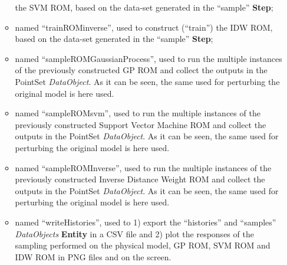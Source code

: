 \begin{enumerate}
\begin{itemize}
     the SVM ROM, based on the data-set generated in the  ``sample'' \textbf{Step};
     \item {} named ``trainROMinverse'', used to construct (``train'')
     the IDW ROM, based on the data-set generated in the  ``sample'' \textbf{Step};
     \item {} named ``sampleROMGaussianProcess'', used to run the multiple
     instances of the previously constructed GP ROM and
     collect the outputs in the PointSet \textit{DataObject}. As it can be
     seen, the same  used for perturbing the original model is here used.
     \item {} named ``sampleROMsvm'', used to run the multiple
     instances of the previously constructed Support Vector Machine ROM and
     collect the outputs in the PointSet \textit{DataObject}. As it can be
     seen, the same  used for perturbing the original model is here used.
     \item {} named ``sampleROMInverse'', used to run the multiple
     instances of the previously constructed Inverse Distance Weight ROM and
     collect the outputs in the PointSet \textit{DataObject}. As it can be
     seen, the same  used for perturbing the original model is here used.
     \item  {} named ``writeHistories'', used to 1) export
     the ``histories'' and ``samples''  \textit{DataObjects}
     \textbf{Entity} in a CSV file and 2) plot the responses of the sampling performed on the physical model, GP ROM,
     SVM ROM and IDW ROM in  PNG files and on the screen.
   \end{itemize}
\end{enumerate}

